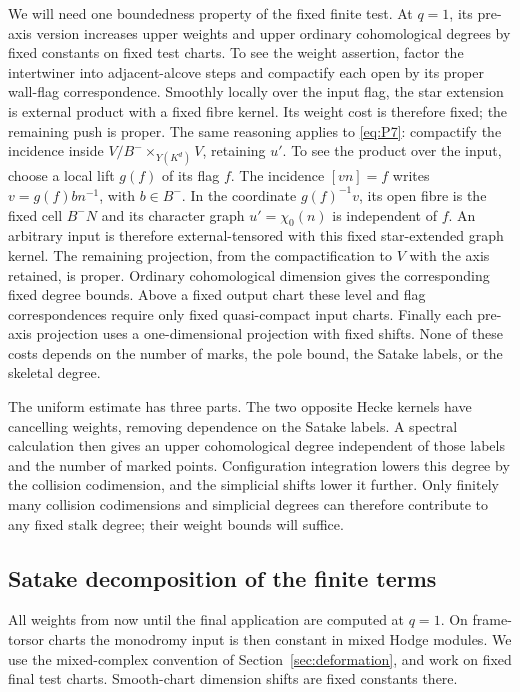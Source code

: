 We will need one boundedness property of the fixed finite test.  At
$q=1$, its pre-axis version increases upper weights and upper ordinary
cohomological degrees by fixed constants on fixed test charts.  To see
the weight assertion, factor the intertwiner into adjacent-alcove
steps and compactify each open by its proper wall-flag correspondence.
Smoothly locally over the input flag, the star extension is external
product with a fixed fibre kernel.  Its weight cost is therefore fixed;
the remaining push is proper.  The same reasoning applies to
\eqref{eq:P7}: compactify the incidence inside
$V/B^-\times_{Y(K^d)}V$, retaining $u'$.  To see the product over the
input, choose a local lift $g(f)$ of its flag $f$.  The incidence
$[vn]=f$ writes $v=g(f)b n^{-1}$, with $b\in B^-$.  In the coordinate
$g(f)^{-1}v$, its open fibre is the fixed cell $B^-N$ and its character
graph $u'=\chi_0(n)$ is independent of $f$.  An arbitrary input is
therefore external-tensored with this fixed star-extended graph kernel.
The remaining projection, from the compactification to $V$ with the
axis retained, is proper.  Ordinary cohomological dimension gives the
corresponding fixed degree bounds.  Above a fixed output chart these
level and flag correspondences require only fixed quasi-compact input
charts.  Finally each pre-axis projection uses a one-dimensional
projection with fixed shifts.  None of these costs depends on the
number of marks, the pole bound, the Satake labels, or the skeletal
degree.

The uniform estimate has three parts.  The two opposite Hecke kernels
have cancelling weights, removing dependence on the Satake labels.
A spectral calculation then gives an upper cohomological degree
independent of those labels and the number of marked points.
Configuration integration lowers this degree by the collision
codimension, and the simplicial shifts lower it further.  Only finitely
many collision codimensions and simplicial degrees can therefore
contribute to any fixed stalk degree; their weight bounds will suffice.

\subsection{Satake decomposition of the finite terms}
\label{planch:satake-decomposition}

All weights from now until the final application are computed at
$q=1$.  On frame-torsor charts the monodromy input is then constant in
mixed Hodge modules.  We use the mixed-complex convention of
Section~\ref{sec:deformation}, and work on fixed final test charts.
Smooth-chart dimension shifts are fixed constants there.

